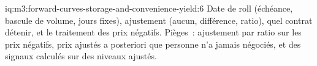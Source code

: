 \begin{solution}{iq:m3:forward-curves-storage-and-convenience-yield:6}
Date de roll (échéance, bascule de volume, jours fixes), ajustement (aucun, différence, ratio), quel contrat
détenir, et le traitement des prix négatifs. Pièges~: ajustement par ratio sur les prix négatifs, prix ajustés a posteriori
que personne n'a jamais négociés, et des signaux calculés sur des niveaux ajustés.
\end{solution}
